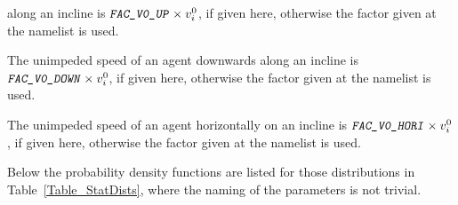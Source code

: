\documentclass[12pt,a4paper,final,twoside]{stylevk}
\begin{document}
\begin{description}
  along an  incline is \linebreak[4] $\textnormal{\texttt{\textsl{FAC\_V0\_UP}}}
  \times v_i^0$, if given here, otherwise the factor given at the
   namelist is used.
%
\item[\Timts{FAC\_V0\_DOWN}] The unimpeded speed of an agent downwards
  along an  incline is $\textnormal{\texttt{\textsl{FAC\_V0\_DOWN}}} \times
  v_i^0$, if given here, otherwise the factor given at the 
  namelist is used.
%
\item[\Timts{FAC\_V0\_HORI}] The unimpeded speed of an agent
  horizontally on an  incline is $\textnormal{\texttt{\textsl{FAC\_V0\_HORI}}}
  \times v_i^0$, if given here, otherwise the factor given at the
   namelist is used.
%
\end{description}

Below the probability density functions are listed for those
distributions in Table~\ref{Table_StatDists}, where the naming of the
parameters is not trivial.
\end{document}
